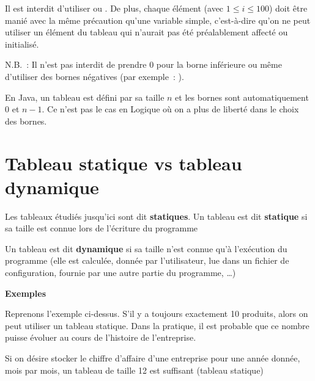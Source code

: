 	
	Il est interdit d’utiliser  ou
	. De plus, chaque élément
	 (avec $1 \leq i \leq 100$) doit
	être manié avec la même précaution qu’une variable simple, c’est-à-dire
	qu’on ne peut utiliser un élément du tableau qui n’aurait pas été
	préalablement affecté ou initialisé.

	N.B.~: Il n'est pas interdit de prendre 0 pour la borne
	inférieure ou même d'utiliser des bornes négatives
	(par exemple~: ).

	En Java, un tableau est défini par sa taille $n$ et les bornes sont
	automatiquement $0$ et $n-1$. Ce n'est pas le cas en
	Logique où on a plus de liberté dans le choix des bornes.

\section{Tableau statique vs tableau dynamique}

	Les tableaux étudiés jusqu'ici sont dit \textbf{statiques}.
	Un tableau est dit \textbf{statique} si sa taille 
	est connue lors de l’écriture du programme

	Un tableau est dit \textbf{dynamique}
	si sa taille n’est connue qu’à l’exécution du programme (elle est
	calculée, donnée par l’utilisateur, lue dans un fichier de
	configuration, fournie par une autre partie du programme, \dots)


	\textbf{Exemples}

	\begin{liste}
	\item
		Reprenons l’exemple ci-dessus. 
		S’il y a toujours exactement 10 produits, 
		alors on peut utiliser un tableau statique. 
		Dans la pratique, il est probable que ce nombre puisse évoluer 
		au cours de l’histoire de l’entreprise.
	\item 
		Si on désire stocker le chiffre d’affaire d’une entreprise 
		pour une année donnée, mois par mois, un tableau de
		taille 12 est suffisant (tableau statique)
	\end{liste}


